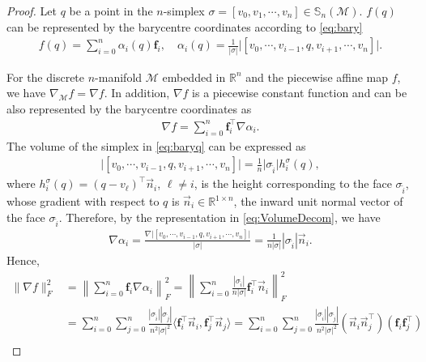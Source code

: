 \documentclass{article}
\begin{document}
\begin{proof}

Let $q$ be a point in the $n$-simplex $\sigma =[v_0,v_1,\cdots,v_{n}] \in \mathbb{S}_n(\mathcal{M})$. $f(q)$ can be represented by the barycentre coordinates according to \eqref{eq:bary}
\begin{align} \label{eq:baryq}
    f(q) = \sum_{i = 0}^{n} \alpha_i(q) \mathbf{f}_i,\quad
    \alpha_i(q) = \frac{1}{|\sigma|}\big| [v_0,\cdots,v_{i-1},q,v_{i+1},\cdots,v_{n}] \big|.
\end{align}

For the discrete $n$-manifold $\mathcal{M}$ embedded in $\mathbb{R}^n$ and the piecewise affine map $f$, we have $\nabla_\mathcal{M} f = \nabla f$.
In addition, $\nabla f$ is a piecewise constant function and can be also represented by the barycentre coordinates as
\begin{align}
    \nabla f = \sum_{i=0}^n \mathbf{f}_i^\top \nabla \alpha_i.
\end{align}
The volume of the simplex in \eqref{eq:baryq} can be expressed as
\begin{align} \label{eq:VolumeDecom}
    \big| [v_0,\cdots,v_{i-1},q,v_{i+1},\cdots,v_{n}] \big| = \frac{1}{n} \big| \sigma_{\hat{i}} \big| h_i^{\sigma}(q),
\end{align}
where $h_i^{\sigma}(q) = (q - v_\ell)^\top \vec{n}_i$, $\ell \neq i$, is the height corresponding to the face $\sigma_{\hat{i}}$, whose gradient with respect to $q$ is $\vec{n}_i \in \mathbb{R}^{1\times n}$, the inward unit normal vector of the face $\sigma_{\hat{i}}$. Therefore, by the representation in \eqref{eq:VolumeDecom},
we have
\begin{align} \label{eq:NablaLambda}
    \nabla \alpha_i = \frac{\nabla \big| [v_0,\cdots,v_{i-1},q,v_{i+1},\cdots,v_{n}] \big|}{|\sigma|}
    = \frac{1}{n|\sigma|} | \sigma_{\hat{i}} | \vec{n}_i.
\end{align}
Hence,
\begin{align}
    \|\nabla f\|^2_F
    &= \left\|\sum_{i = 0}^n \mathbf{f}_i \nabla \alpha_i \right\|^2_F
    = \left\|\sum_{i = 0}^n \frac{|\sigma_{\hat{i}}|}{n|\sigma|} \mathbf{f}_i^\top \vec{n}_i \right\|^2_F \\
    &= \sum_{i = 0}^n \sum_{j = 0}^n \frac{|\sigma_{\hat{i}}||\sigma_{\hat{j}}|}{n^2|\sigma|^2} \langle \mathbf{f}_{i}^\top\vec{n}_i, \mathbf{f}_{j}^\top\vec{n}_j \rangle
    = \sum_{i = 0}^n\sum_{j = 0}^n \frac{|\sigma_{\hat{i}}||\sigma_{\hat{j}}|}{n^2|\sigma|^2}  (\vec{n}_i \vec{n}_j^\top) (\mathbf{f}_{i}\mathbf{f}_{j}^\top)\\

\end{align}
\end{proof}
\end{document}

